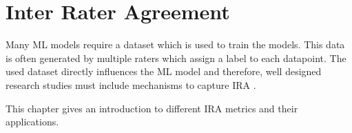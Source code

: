 \section{Inter Rater Agreement}
\label{chp:fundamentals:sec:inter_rater_agreement}
Many \ac{ML} models require a dataset which is used to train the models.
This data is often generated by multiple raters which assign a label to each datapoint.
The used dataset directly influences the \ac{ML} model \parencite{Gray:2011} and therefore, well designed research studies must include mechanisms to capture \ac{IRA} \parencite{McHugh:2012}.

This chapter gives an introduction to different \ac{IRA} metrics and their applications.





